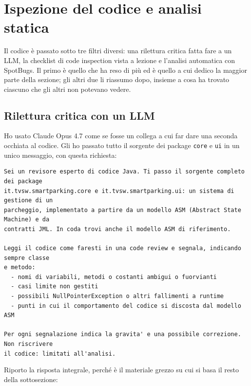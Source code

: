 \newpage
\section{Ispezione del codice e analisi statica}
\label{sec:analisi-statica}

Il codice è passato sotto tre filtri diversi: una rilettura critica fatta fare a un LLM,
la checklist di code inspection vista a lezione e l'analisi automatica con SpotBugs. Il
primo è quello che ha reso di più ed è quello a cui dedico la maggior parte della
sezione; gli altri due li riassumo dopo, insieme a cosa ha trovato ciascuno che gli altri
non potevano vedere.

\subsection{Rilettura critica con un LLM}
\label{sec:llm-review}

Ho usato Claude Opus 4.7 come se fosse un collega a cui far dare una seconda occhiata al
codice. Gli ho passato tutto il sorgente dei package \texttt{core} e \texttt{ui} in un
unico messaggio, con questa richiesta:

\begin{lstlisting}[style=llm]
Sei un revisore esperto di codice Java. Ti passo il sorgente completo dei package
it.tvsw.smartparking.core e it.tvsw.smartparking.ui: un sistema di gestione di un
parcheggio, implementato a partire da un modello ASM (Abstract State Machine) e da
contratti JML. In coda trovi anche il modello ASM di riferimento.

Leggi il codice come faresti in una code review e segnala, indicando sempre classe
e metodo:
  - nomi di variabili, metodi o costanti ambigui o fuorvianti
  - casi limite non gestiti
  - possibili NullPointerException o altri fallimenti a runtime
  - punti in cui il comportamento del codice si discosta dal modello ASM

Per ogni segnalazione indica la gravita' e una possibile correzione. Non riscrivere
il codice: limitati all'analisi.
\end{lstlisting}

Riporto la risposta integrale, perché è il materiale grezzo su cui si basa il resto
della sottosezione:

